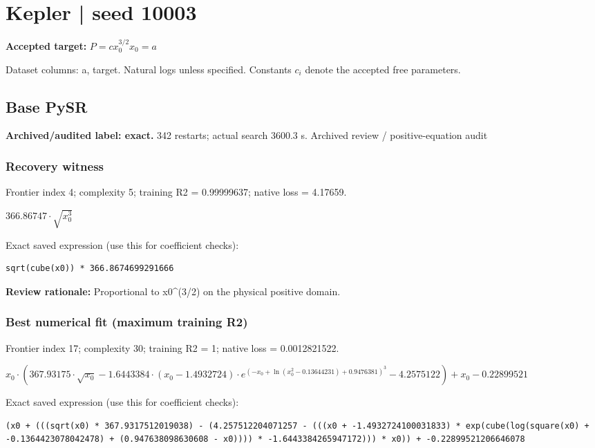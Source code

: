 \documentclass[10pt,letterpaper,landscape]{article}
\begin{document}
\section*{Kepler | seed 10003}
\textbf{Accepted target:} $\displaystyle P=c x_0^{3/2}$\hfill $x_0=a$\par
{\small Dataset columns: a, target. Natural logs unless specified. Constants $c_i$ denote the accepted free parameters.}\par\medskip
\begin{minipage}[t]{0.485\textwidth}
\subsection*{Base PySR}
\textbf{Archived/audited label: exact.} 342 restarts; actual search 3600.3 s.
{\small Archived review / positive-equation audit}
\subsubsection*{Recovery witness}
Frontier index 4; complexity 5; training R2 = 0.99999637; native loss = 4.17659.
\begin{center}\begin{adjustbox}{max width=\linewidth,max totalheight=1.0in}$\displaystyle 366.86747 \cdot \sqrt{x_{0}^{3}}$\end{adjustbox}\end{center}
{\scriptsize Exact saved expression (use this for coefficient checks):}
\begin{lstlisting}
sqrt(cube(x0)) * 366.8674699291666
\end{lstlisting}
{\small\textbf{Review rationale:} Proportional to x0\textasciicircum{}(3/2) on the physical positive domain.}
\subsubsection*{Best numerical fit (maximum training R2)}
Frontier index 17; complexity 30; training R2 = 1; native loss = 0.0012821522.
\begin{center}\begin{adjustbox}{max width=\linewidth,max totalheight=1.0in}$\displaystyle x_{0} \cdot \left(367.93175 \cdot \sqrt{x_{0}} - 1.6443384 \cdot \left(x_{0} - 1.4932724\right) \cdot e^{\left(- x_{0} + \ln{\left(x_{0}^{2} - 0.13644231 \right)} + 0.9476381\right)^{3}} - 4.2575122\right) + x_{0} - 0.22899521$\end{adjustbox}\end{center}
{\scriptsize Exact saved expression (use this for coefficient checks):}
\begin{lstlisting}
(x0 + (((sqrt(x0) * 367.9317512019038) - (4.257512204071257 - (((x0 + -1.4932724100031833) * exp(cube(log(square(x0) + -0.1364423078042478) + (0.947638098630608 - x0)))) * -1.6443384265947172))) * x0)) + -0.22899521206646078
\end{lstlisting}
\end{minipage}\hfill
\end{document}
